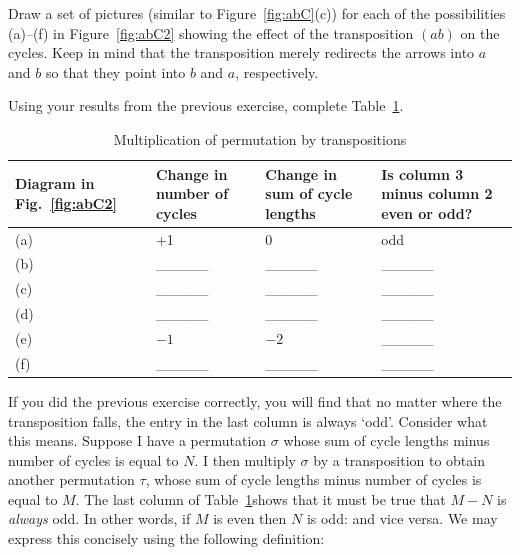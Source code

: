 \begin{exercise}{}
Draw  a set of pictures (similar to Figure~\ref{fig:abC}(c)) for each of the possibilities (a)--(f) in Figure~\ref{fig:abC2} showing the effect of the transposition $(ab)$ on the cycles.   Keep in mind that the transposition merely redirects the arrows into $a$ and $b$ so that they point into $b$ and $a$, respectively.
\end{exercise}

\begin{exercise}{}
Using your results from the previous exercise, complete Table~\ref{transposition_table}.
\end{exercise}

\begin{table}[!htb]
\caption{Multiplication of permutation by transpositions}\label{transposition_table}
\begin{tabular}{|p{1.6cm}|p{2.7cm}|p{2.7cm}|p{3.5cm}|}
\hline 
\rule{0pt}{2.6ex} Diagram in Fig.~\ref{fig:abC2}&  Change in number of cycles   & Change in sum of cycle lengths & Is column 3 minus column 2 even or odd?  \rule[-1.2ex]{0pt}{0pt} \tabularnewline
\hline
\hline 
\rule{0pt}{2.6ex} (a)  &  +1  & 0  & odd \rule[-1.2ex]{0pt}{0pt} \tabularnewline
\hline 
\rule{0pt}{2.6ex} (b)  &  \_\_\_\_\_ & \_\_\_\_\_ & \_\_\_\_\_ \rule[-1.2ex]{0pt}{0pt} \tabularnewline
\hline 
\rule{0pt}{2.6ex} (c)  &  \_\_\_\_\_ & \_\_\_\_\_  & \_\_\_\_\_ \rule[-1.2ex]{0pt}{0pt} \tabularnewline
\hline 
\rule{0pt}{2.6ex} (d)  &  \_\_\_\_\_ & \_\_\_\_\_  & \_\_\_\_\_ \rule[-1.2ex]{0pt}{0pt} \tabularnewline
\hline 
\rule{0pt}{2.6ex} (e)  & $-1$ & $-2$ & \_\_\_\_\_ \rule[-1.2ex]{0pt}{0pt} \tabularnewline
\hline 
\rule{0pt}{2.6ex} (f)  &  \_\_\_\_\_ & \_\_\_\_\_ & \_\_\_\_\_  \rule[-1.2ex]{0pt}{0pt} \tabularnewline
\hline 
\end{tabular}
\end{table}

If you did the previous exercise correctly, you will find that no matter where the transposition falls,  the entry in the last column   is always `odd'. Consider what this means. Suppose I have a permutation  $\sigma$ whose sum of cycle lengths minus number of cycles is equal to $N$. I then multiply $\sigma$ by a transposition to obtain another permutation $\tau$, whose sum of cycle lengths minus number of cycles is equal to $M$. The last column of Table~\ref{transposition_table}shows that it must be true that $M-N$ is \emph{always} odd. In other words, if $M$ is even then $N$ is odd: and vice versa. We may express this concisely using the following definition:


